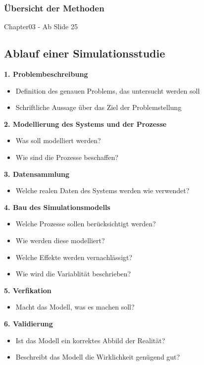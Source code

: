 \documentclass{report}
\theoremstyle{definition}
\theoremstyle{example}
\begin{document}
      \subsubsection{Übersicht der Methoden}
Chapter03 - Ab Slide 25

   \subsection{Ablauf einer Simulationsstudie}
\textbf{1. Problembeschreibung}
\begin{itemize}
   \item Definition des genauen Problems, das untersucht werden soll
   \item Schriftliche Aussage über das Ziel der Problemstellung
\end{itemize}

\textbf{2. Modellierung des Systems und der Prozesse}
\begin{itemize}
   \item Was soll modelliert werden?
   \item Wie sind die Prozesse beschaffen?
\end{itemize}

\textbf{3. Datensammlung}
\begin{itemize}
   \item Welche realen Daten des Systems werden wie verwendet?
\end{itemize}

\textbf{4. Bau des Simulationsmodells}
\begin{itemize}
   \item Welche Prozesse sollen berücksichtigt werden?
   \item Wie werden diese modelliert?
   \item Welche Effekte werden vernachlässigt?
   \item Wie wird die Variablität beschrieben?
\end{itemize}

\textbf{5. Verfikation}
\begin{itemize}
   \item Macht das Modell, was es machen soll?
\end{itemize}

\textbf{6. Validierung}
\begin{itemize}
   \item Ist das Modell ein korrektes Abbild der Realität?
   \item Beschreibt das Modell die Wirklichkeit genügend gut?
\end{itemize}
\end{document}
